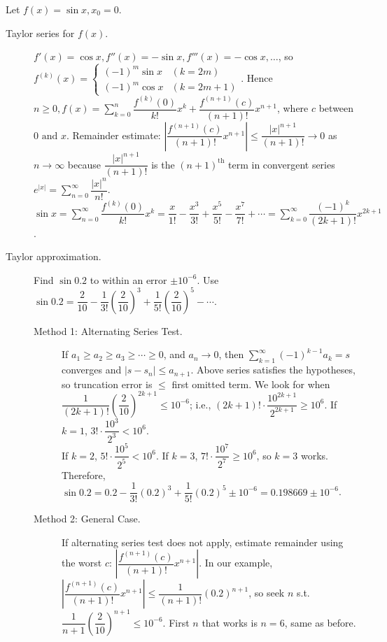 \begin{example}
	Let $f(x)=\sin{x}, x_0=0$.
	\begin{description}
		\item[Taylor series for $f(x)$.]
		      $f'(x)=\cos{x}, f''(x)=-\sin{x}, f'''(x)=-\cos{x},\ldots $, so
		      $f^{(k)}(x)=\begin{cases}
				      (-1)^{m}\sin{x}  & (k=2m)   \\
				      (-1)^{m} \cos{x} & (k=2m+1)
			      \end{cases}$.
		      Hence $n\ge 0, f(x)= \sum_{k=0}^{n}{\dfrac{f^{(k)}(0)}{k!}}x^{k}+\dfrac{f^{(n+1)}(c)}{(n+1)!}x^{n+1}$, where $c$ between $0 \text{ and } x$.
		      Remainder estimate: $\left|\dfrac{f^{(n+1)}(c)}{(n+1)!}x^{n+1} \right|\le \dfrac{ \left| x \right| ^{n+1} }{(n+1)!} \to 0$ as $n\to \infty$ because $\dfrac{|x|^{n+1}}{(n+1)!}$ is the $(n+1)^{\text{th}}$ term in convergent series $e^{|x|}=\sum_{n=0}^{\infty}{\dfrac{|x|^{n}}{n!}}$.
		      \\$\sin{x}= \sum_{n=0}^{\infty}{\dfrac{f^{(k)}(0)}{k!}x^{k}}=\dfrac{x}{1!}-\dfrac{x^3}{3!}+\dfrac{x^{5}}{5!}-\dfrac{x^{7}}{7!}+ \cdots=\sum_{k=0}^{\infty}{\dfrac{(-1)^{k}}{(2k+1)!}x^{2k+1}}$.
		\item [Taylor approximation.]
		      Find $\sin{0.2}$ to within an error $\pm 10^{-6}$.
		      Use $\sin{0.2}=\dfrac{2}{10}-\dfrac{1}{3!}(\dfrac{2}{10})^{3}+\dfrac{1}{5!}(\dfrac{2}{10})^{5}- \cdots$.
		      \begin{description}
			      \item[Method 1: Alternating Series Test.]
			            If $a_1\ge a_2\ge a_3\ge  \cdots \ge 0$, and $a_{n}\to 0$, then $\sum_{k=1}^{\infty}{(-1)^{k-1}a_{k}}=s$ converges and $|s-s_{n}|\le a_{n+1}$.
			            Above series satisfies the hypotheses, so truncation error is $\le $ first omitted term. We look for when $\dfrac{1}{(2k+1)!}(\dfrac{2}{10})^{2k+1}\le 10^{-6}$; i.e., $(2k+1)! \cdot \dfrac{10^{2k+1}}{2^{2k+1}}\ge 10^{6}$.
			            If $k=1$, $3! \cdot \dfrac{10^{3}}{2^{3}}< 10^{6}$.\\
			            If $k=2$, $5! \cdot \dfrac{10^{5}}{2^{5}}< 10^{6}$.
			            If $k=3$, $7! \cdot \dfrac{10^{7}}{2^{7}}\ge 10^{6}$, so $k=3$ works.
			            Therefore, $\sin{0.2}=0.2-\dfrac{1}{3!}(0.2)^{3}+\dfrac{1}{5!}(0.2)^{5}\pm 10^{-6}=0.198669\pm 10^{-6}$.
			      \item[Method 2: General Case.]
			            If alternating series test does not apply, estimate remainder using the worst $c$: $\left| \dfrac{f^{(n+1)}(c)}{(n+1)!}x^{n+1}\right|$. In our example, $\left| \dfrac{f^{(n+1)}(c)}{(n+1)!} x^{n+1}\right|\le \dfrac{1}{(n+1)!}(0.2)^{n+1}$, so seek $n$ s.t. $\dfrac{1}{n+1}\left(\dfrac{2}{10}\right)^{n+1}\le 10^{-6}$. First $n$ that works is $n=6$, same as before.
		      \end{description}
	\end{description}
\end{example}

